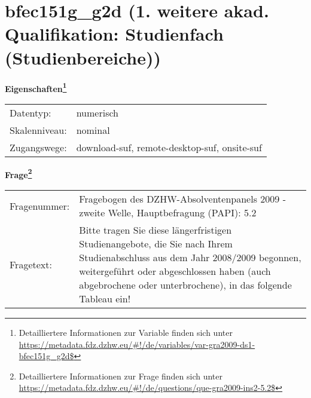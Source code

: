 
    \setcounter{footnote}{0}

    \vspace*{-1.8cm}
	\section{bfec151g\_g2d (1. weitere akad. Qualifikation: Studienfach (Studienbereiche))}
	\label{section:bfec151g_g2d}



    \vspace*{0.5cm}
    \noindent\textbf{Eigenschaften\footnote{Detailliertere Informationen zur Variable finden sich unter
		\url{https://metadata.fdz.dzhw.eu/\#!/de/variables/var-gra2009-ds1-bfec151g_g2d$}}}\\
	\begin{tabularx}{\hsize}{@{}lX}
	Datentyp: & numerisch \\
	Skalenniveau: & nominal \\
	Zugangswege: &
	  download-suf, 
	  remote-desktop-suf, 
	  onsite-suf
 \\
    \end{tabularx}



				\vspace*{0.5cm}
                \noindent\textbf{Frage\footnote{Detailliertere Informationen zur Frage finden sich unter
		              \url{https://metadata.fdz.dzhw.eu/\#!/de/questions/que-gra2009-ins2-5.2$}}}\\
				\begin{tabularx}{\hsize}{@{}lX}
					Fragenummer: &
					  Fragebogen des DZHW-Absolventenpanels 2009 - zweite Welle, Hauptbefragung (PAPI):
					  5.2
 \\
					Fragetext: & Bitte tragen Sie diese längerfristigen Studienangebote, die Sie nach Ihrem Studienabschluss aus dem Jahr 2008/2009 begonnen, weitergeführt oder abgeschlossen haben (auch abgebrochene oder unterbrochene), in das folgende Tableau ein! \\
				\end{tabularx}





